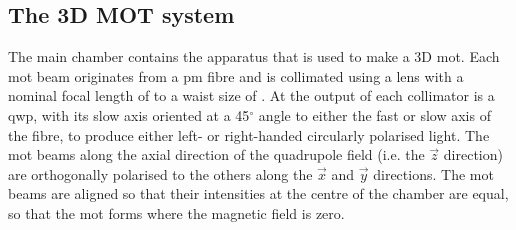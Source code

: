 \subsection{The 3D MOT system}\label{sec:3d_mot}
The main chamber contains the apparatus that is used to make a 3D \ac{mot}. Each \ac{mot} beam originates from a \ac{pm} fibre and is collimated using a
lens with a nominal focal length of  to a waist size of . At the output
of each collimator is a \ac{qwp}, with its slow axis oriented at a 45\(^\circ\)
angle to either the fast or slow axis of the fibre, to produce either left- or right-handed circularly polarised light. The \ac{mot} beams along the axial direction of the quadrupole field
(i.e. the \(\vec{z}\) direction) are orthogonally
polarised to the others along the \(\vec{x}\) and \(\vec{y}\) directions. The \ac{mot} beams are aligned so that their intensities at the centre of the chamber are equal, so that the \ac{mot} forms where the magnetic field is zero.
